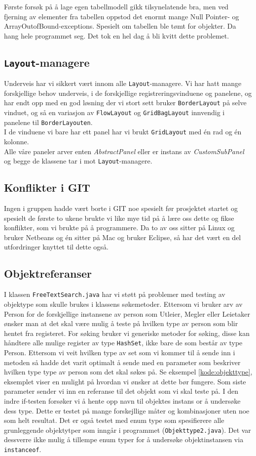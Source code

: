 Første forsøk på å lage egen tabellmodell gikk tilsynelatende bra, men ved fjerning av elementer fra tabellen oppstod det enormt mange Null Pointer- og ArrayOutofBound-exceptions. Spesielt om tabellen ble tømt for objekter. Da hang hele programmet seg. Det tok en hel dag å bli kvitt dette problemet. 
\subsection{\texttt{Layout}-managere}
Underveis har vi sikkert vært innom alle \texttt{Layout}-managere. Vi har hatt mange forskjellige behov underveis, i de forskjellige registreringsvinduene og panelene, og har endt opp med en god løsning der vi stort sett bruker \texttt{BorderLayout} på selve vinduet, og så en variasjon av \texttt{FlowLayout} og \texttt{GridBagLayout} innvendig i panelene til \texttt{BorderLayouten}. \\
I de vinduene vi bare har ett panel har vi brukt \texttt{GridLayout} med én rad og én kolonne. \\
Alle våre paneler arver enten \emph{AbstractPanel} eller er instans av \emph{CustomSubPanel} og begge de klassene tar i mot \texttt{Layout}-managere.

\subsection{Konflikter i GIT}
Ingen i gruppen hadde vært borte i GIT noe spesielt før prosjektet startet og spesielt de første to ukene brukte vi like mye tid på å lære oss dette og fikse konflikter, som vi brukte på å programmere. Da to av oss sitter på Linux og bruker Netbeans og én sitter på Mac og bruker Eclipse, så har det vært en del utfordringer knyttet til dette også.


\subsection{Objektreferanser}
I klassen \texttt{FreeTextSearch.java} har vi støtt på problemer med testing av objektype som skulle brukes i klassens søkemetoder. Ettersom vi bruker arv av Person for de forskjellige instansene av person som Utleier, Megler eller Leietaker ønsker man at det skal være mulig å teste på hvilken type av person som blir hentet fra registeret. For søking bruker vi generiske metoder for søking, disse kan håndtere alle mulige register av type \texttt{HashSet}, ikke bare de som består av type Person. Ettersom vi veit hvilken type av set som vi kommer til å sende inn i metoden så hadde det varit optimalt å sende med en parameter som beskriver hvilken type type av person som det skal søkes på. Se eksempel \ref{kode:objekttype}, eksemplet viser en mulight på hvordan vi ønsker at dette bør fungere. Som siste parameter sender vi inn en referanse til det objekt som vi skal teste på. I den indre if-testen forsøker vi å hente opp navn til objektes instans or å undersøke dess type. Dette er testet på mange forskejllige måter og kombinasjoner uten noe som helt resultat. Det er også testet med enum type som spesifierere alle grunleggende objektytper som inngår i programmet (\texttt{Objekttype2.java}). Det var dessverre ikke mulig å tillempe enum typer for å undersøke objektinstansen via \texttt{instanceof}.


